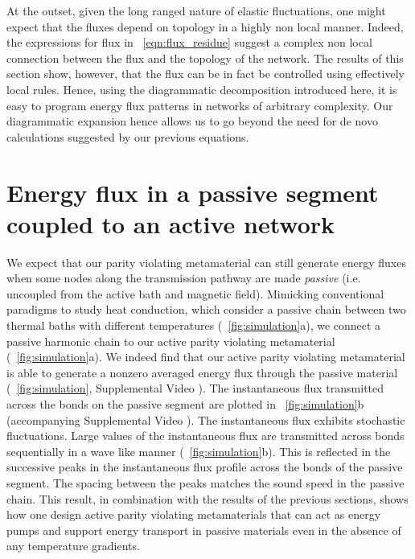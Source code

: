 \documentclass[
 preprint,
 preprintnumbers,
 amsmath,amssymb,
 aps,
 pre,
 longbibliography,
 superscriptaddress,
 10pt, twocolumn
]{revtex4-1}
\begin{document}
At the outset, given the long ranged nature of elastic fluctuations, one might expect that the fluxes depend on topology in a highly non local manner. Indeed, the expressions for flux in \eqnname~\ref{eqn:flux_residue} suggest a complex non local connection between the flux and the topology of the network. The results of this section show, however, that the flux can be in fact be controlled using effectively local rules. Hence, using the diagrammatic decomposition introduced here, it is easy to program energy flux patterns in networks of arbitrary complexity. Our diagrammatic expansion hence allows us to go beyond the need for de novo calculations suggested by our previous equations.

\section{Energy flux in a passive segment coupled to an active network} \label{sec:passive}
\label{sec:passiveflux}
We expect that our parity violating metamaterial can still generate energy fluxes when some nodes along the transmission pathway are made {\it passive} (i.e. uncoupled from the active bath and magnetic field).
Mimicking conventional paradigms to study heat conduction, which consider a passive chain between two thermal baths with different temperatures (\figurename~\ref{fig:simulation}a), we connect a passive harmonic chain to our active parity violating metamaterial (\figurename~\ref{fig:simulation}a).
We indeed find that our active parity violating metamaterial is able to generate a nonzero averaged energy flux through the passive material (\figurename~\ref{fig:simulation}, Supplemental Video \cite{SupplementalMaterial}). The instantaneous flux transmitted across the bonds on the passive segment are plotted in \figurename~\ref{fig:simulation}b (accompanying Supplemental Video \cite{SupplementalMaterial}). The instantaneous flux exhibits stochastic fluctuations. Large values of the instantaneous flux are transmitted across bonds sequentially in a wave like manner (\figurename~\ref{fig:simulation}b). This is reflected in the successive peaks in the instantaneous flux profile across the bonds of the passive segment.  The spacing between the peaks matches the sound speed in the passive chain. This result, in combination with the results of the previous sections, shows how one design active parity violating metamaterials that can act as energy pumps and support energy transport in passive materials even in the absence of any temperature gradients. 
\end{document}
